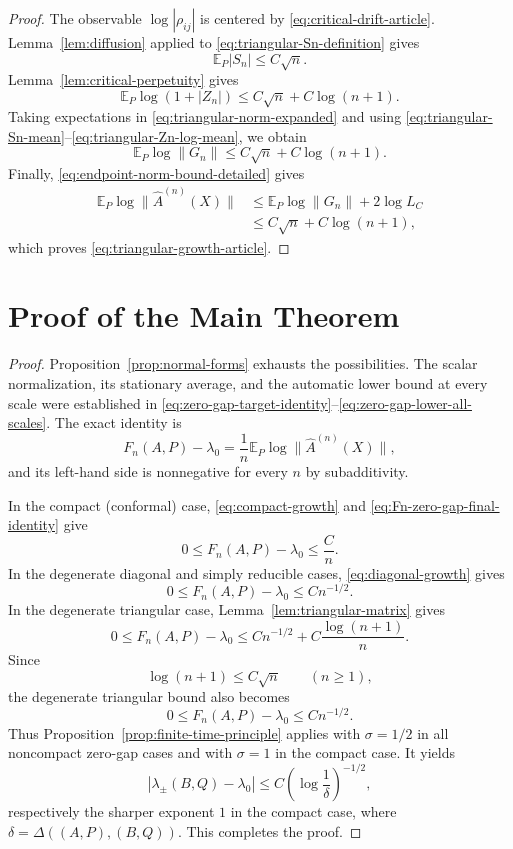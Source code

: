 \documentclass[11pt,a4paper]{amsart}
\theoremstyle{definition}
\theoremstyle{remark}
\numberwithin{equation}{section}
\newcommand{\EE}{\mathbb E}
\newcommand{\1}{\boldsymbol 1}
\begin{document}
\begin{proof}
The observable $\log|\rho_{ij}|$ is centered by
\eqref{eq:critical-drift-article}.  Lemma~\ref{lem:diffusion} applied
to \eqref{eq:triangular-Sn-definition} gives
\begin{equation}\label{eq:triangular-Sn-mean}
 \EE_P|S_n|\le C\sqrt n.
\end{equation}
Lemma~\ref{lem:critical-perpetuity} gives
\begin{equation}\label{eq:triangular-Zn-log-mean}
 \EE_P\log(1+|Z_n|)
 \le C\sqrt n+C\log(n+1).
\end{equation}
Taking expectations in \eqref{eq:triangular-norm-expanded} and using
\eqref{eq:triangular-Sn-mean}--\eqref{eq:triangular-Zn-log-mean}, we obtain
$$
 \EE_P\log\|G_n\|
 \le C\sqrt n+C\log(n+1).
$$
Finally, \eqref{eq:endpoint-norm-bound-detailed} gives
\begin{align*}
 \EE_P\log\|\widehat A^{(n)}(X)\|
 &\le\EE_P\log\|G_n\|+2\log L_C\\
 &\le C\sqrt n+C\log(n+1),
\end{align*}
which proves \eqref{eq:triangular-growth-article}.
\end{proof}


\section{Proof of the Main Theorem}

\begin{proof}
Proposition~\ref{prop:normal-forms} exhausts the possibilities.
The scalar normalization, its stationary average, and the automatic lower bound at every scale were established in
\eqref{eq:zero-gap-target-identity}--\eqref{eq:zero-gap-lower-all-scales}. The exact identity is
\begin{equation}\label{eq:Fn-zero-gap-final-identity}
 F_n(A,P)-\lambda_0
 =\frac1n\EE_P\log\|\widehat A^{(n)}(X)\|,
\end{equation}
and its left-hand side is nonnegative for every $n$ by
subadditivity.

In the compact (conformal) case, \eqref{eq:compact-growth} and
\eqref{eq:Fn-zero-gap-final-identity} give
$$
 0\le F_n(A,P)-\lambda_0\le\frac Cn.
$$
In the degenerate diagonal and simply reducible cases, \eqref{eq:diagonal-growth} gives
$$
 0\le F_n(A,P)-\lambda_0\le Cn^{-1/2}.
$$
In the degenerate triangular case, Lemma~\ref{lem:triangular-matrix} gives
$$
 0\le F_n(A,P)-\lambda_0
 \le Cn^{-1/2}+C\frac{\log(n+1)}n.
$$
Since
$$
 \log(n+1)\le C\sqrt n
 \qquad(n\ge1),
$$
the degenerate triangular bound also becomes
$$
 0\le F_n(A,P)-\lambda_0\le Cn^{-1/2}.
$$
Thus Proposition~\ref{prop:finite-time-principle} applies with
$\sigma=1/2$ in all noncompact zero-gap cases and with $\sigma=1$
in the compact case.  It yields
$$
 |\lambda_\pm(B,Q)-\lambda_0|
 \le C\left(\log\frac1\delta\right)^{-1/2},
$$
respectively the sharper exponent $1$ in the compact case, where
$\delta=\Delta((A,P),(B,Q))$.  This completes the proof.
\end{proof}



\end{document}
